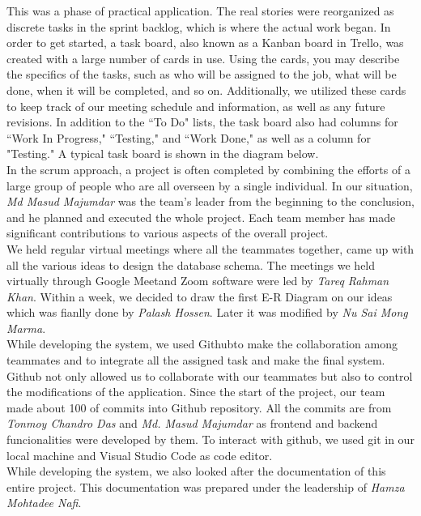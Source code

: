 \begin{enumerate}
This was a phase of practical application. The real stories were reorganized as discrete tasks in the sprint backlog, which is where the actual work began. In order to get started, a task board, also known as a Kanban board in Trello\footnotemark , was created with a large number of cards in use. Using the cards, you may describe the specifics of the tasks, such as who will be assigned to the job, what will be done, when it will be completed, and so on. Additionally, we utilized these cards to keep track of our meeting schedule and information, as well as any future revisions. In addition to the ``To Do" lists, the task board also had columns for ``Work In Progress," ``Testing," and ``Work Done," as well as a column for "Testing." A typical task board is shown in the diagram below.
\\

In the scrum approach, a project is often completed by combining the efforts of a large group of people who are all overseen by a single individual. In our situation, \textit{Md Masud Majumdar} was the team's leader from the beginning to the conclusion, and he planned and executed the whole project. Each team member has made significant contributions to various aspects of the overall project.\\

We held regular virtual meetings where all the teammates together, came up with all the various ideas to design the database schema. The meetings we held virtually through Google Meet\footnotemark and Zoom software were led by \textit{Tareq Rahman Khan}. Within a week, we decided to draw the first E-R Diagram on our ideas which was fianlly done by \textit{Palash Hossen}. Later it was modified by \textit{Nu Sai Mong Marma}.\\

While developing the system, we used Github\footnotemark to make the collaboration among teammates and to integrate all the assigned task and make the final system. Github not only allowed us to collaborate with our teammates but also to control the modifications of the application. Since the start of the project, our team made about 100 of commits into Github repository. All the commits are from \textit{Tonmoy Chandro Das} and \textit{Md. Masud Majumdar} as frontend and backend funcionalities were developed by them. To interact with github, we used git in our local machine and Visual Studio Code as code editor.\\

While developing the system, we also looked after the documentation of this entire project. This documentation was prepared under the leadership of \textit{Hamza Mohtadee Nafi}.\\


\end{enumerate}
